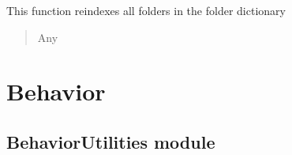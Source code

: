 \documentclass[letterpaper,10pt,english]{sphinxmanual}
\begin{document}
\begin{fulllineitems}

\begin{fulllineitems}
\label{\detokenize{ExperimentHierarchy:ExperimentHierarchy.ExperimentStage.update_folder_dictionary}}
\pysigstartsignatures
{}
\pysigstopsignatures
\sphinxAtStartPar
This function reindexes all folders in the folder dictionary
\begin{quote}\begin{description}
\sphinxAtStartPar
Any

\end{description}\end{quote}

\end{fulllineitems}


\end{fulllineitems}


\sphinxstepscope


\chapter{Behavior}
\label{\detokenize{Behavior:behavior}}\label{\detokenize{Behavior::doc}}
\sphinxstepscope


\section{BehaviorUtilities module}
\label{\detokenize{BehaviorUtilities:module-BehaviorUtilities}}\label{\detokenize{BehaviorUtilities:behaviorutilities-module}}\label{\detokenize{BehaviorUtilities::doc}}
\end{document}
